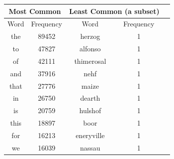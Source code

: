 \documentclass[a4paper, 12pt]{article}
\begin{document}
\noindent

\begin{table}[h]
\centering
\label{Most and Least Common Words}
\begin{tabular}{|c|c|c|c|c|}
\multicolumn{2}{c}{Most Common} & \multicolumn{2}{l}{Least Common (a subset)} \\
\hline
Word                 & Frequency        &  Word & Frequency      \\
\hline
the                  & 89452                & herzog &1\\
to                  & 47827                 &   alfonso &1\\
of                    & 42111                  & thimerosal&1\\
and                   & 37916                    & nehf&1\\
that            & 27776                   & maize&1\\
in                   & 26750                   & dearth&1\\
is                   & 20759                   &hulshof&1\\
this                    & 18897                   & boor&1\\
for                   & 16213                    &eneryville& 1\\
we                & 16039                 & nassau & 1 \\
\hline
\end{tabular}
\end{table}
\noindent
\end{document}
